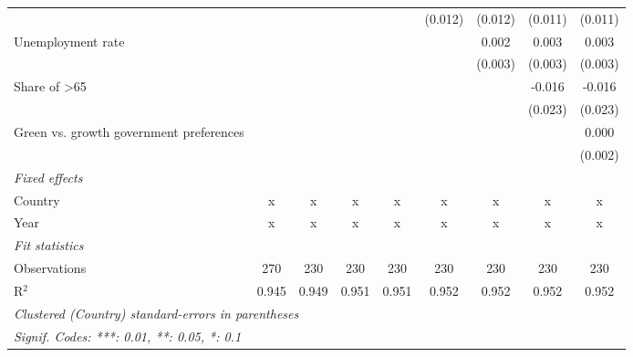 \begin{table}[htbp]
\begin{tabular}{lcccccccc}
                                              &         &         &               &               & (0.012)       & (0.012)       & (0.011)       & (0.011)\\   
      Unemployment rate                       &         &         &               &               &               & 0.002         & 0.003         & 0.003\\   
                                              &         &         &               &               &               & (0.003)       & (0.003)       & (0.003)\\   
      Share of >65                            &         &         &               &               &               &               & -0.016        & -0.016\\   
                                              &         &         &               &               &               &               & (0.023)       & (0.023)\\   
      Green vs. growth government preferences &         &         &               &               &               &               &               & 0.000\\   
                                              &         &         &               &               &               &               &               & (0.002)\\   
      \emph{Fixed effects}\\
      Country                                 & x       & x       & x             & x             & x             & x             & x             & x\\  
      Year                                    & x       & x       & x             & x             & x             & x             & x             & x\\  
      \midrule \emph{Fit statistics}\\
      Observations                            & 270     & 230     & 230           & 230           & 230           & 230           & 230           & 230\\  
      R$^2$                                   & 0.945   & 0.949   & 0.951         & 0.951         & 0.952         & 0.952         & 0.952         & 0.952\\  
      \midrule
      \multicolumn{9}{l}{\emph{Clustered (Country) standard-errors in parentheses}}\\
      \multicolumn{9}{l}{\emph{Signif. Codes: ***: 0.01, **: 0.05, *: 0.1}}\\
   \end{tabular}
\end{table}


